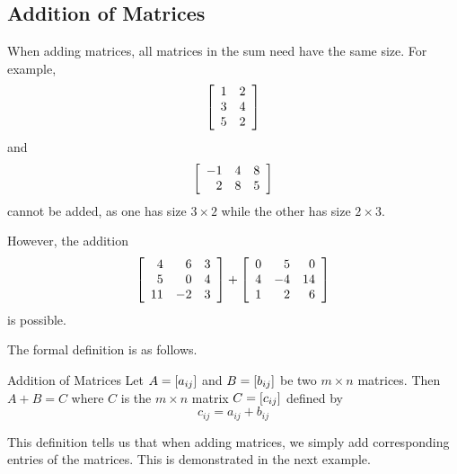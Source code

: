 \subsection{Addition of Matrices}

When adding matrices, all matrices in the sum need have the same size.
For example,
\begin{equation*}
\left[
\begin{array}{rr}
1 & 2 \\
3 & 4 \\
5 & 2
\end{array}
\right] 
\end{equation*}
and
\begin{equation*}
\left[
\begin{array}{rrr}
-1 & 4 & 8\\
2 & 8 & 5
\end{array}
\right] 
\end{equation*}
cannot be added, as one has size $3 \times 2$ while the other has size $2 \times 3$.

However, the addition
\begin{equation*}
\left[
\begin{array}{rrr}
4 & 6 & 3\\
5 & 0 & 4\\
11 & -2 & 3
\end{array}
\right] 
+
\left[
\begin{array}{rrr}
0 & 5 & 0 \\
4 & -4 & 14 \\
1 & 2 & 6
\end{array}
\right]
\end{equation*}
is possible.

The formal definition is as follows.

\begin{definition}{Addition of Matrices}\label{def:additionofmatrices}
Let $A=\left[ a_{ij}\right] $ and $B=\left[ b_{ij}\right] $ be two
$m\times n$ matrices. Then $A+B=C$  where $C$ is the $m \times n$
matrix $C=\left[ c_{ij}\right]$ defined by
\begin{equation*}
c_{ij}=a_{ij}+b_{ij}
\end{equation*}

\end{definition}

This definition tells us that when adding matrices, we simply add corresponding entries of the matrices. 
This is demonstrated in the next example. 

